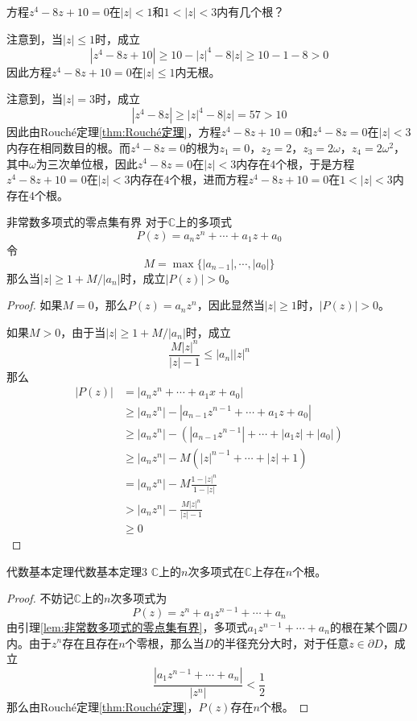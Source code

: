 \documentclass[lang = cn, scheme = chinese, thmcnt = section]{elegantbook}
\newcommand{\C}{\mathbb{C}}  		   %
\begin{document}
\begin{example}
	方程$z^4-8z+10=0$在$|z|<1$和$1<|z|<3$内有几个根？
\end{example}

\begin{solution}
	注意到，当$|z|\le 1$​时，成立
	$$
	|z^4-8z+10|\ge10-|z|^4-8|z|\ge10-1-8>0
	$$
	因此方程$z^4-8z+10=0$在$|z|\le 1$内无根。
	
	注意到，当$|z|=3$时，成立
	$$
	|z^4-8z|\ge|z|^4-8|z|=57>10
	$$
	因此由Rouché定理\ref{thm:Rouché定理}，方程$z^4-8z+10=0$和$z^4-8z=0$在$|z|<3$内存在相同数目的根。而$z^4-8z=0$的根为$z_1=0$，$z_2=2$，$z_3=2\omega$，$z_4=2\omega^2$，其中$\omega$为三次单位根，因此$z^4-8z=0$在$|z|<3$内存在$4$个根，于是方程$z^4-8z+10=0$在$|z|<3$内存在$4$个根，进而方程$z^4-8z+10=0$在$1<|z|<3$内存在$4$个根。
\end{solution}

\begin{lemma}{}{非常数多项式的零点集有界}
	对于$\C$上的多项式%
	$$
	P(z)=a_nz^n+\cdots+a_1z+a_0
	$$
	令%
	$$
	M=\max\{ |a_{n-1}|,\cdots,|a_0| \}
	$$
	那么当$|z|\ge  1+M/|a_n|$时，成立$|P(z)|>0$。
\end{lemma}

\begin{proof}
	如果$M=0$，那么$P(z)=a_nz^n$，因此显然当$|z|\ge 1$时，$|P(z)|>0$。
	
	如果$M>0$，由于当$|z|\ge  1+M/|a_n|$时，成立%
	$$
	\frac{M|z|^n}{|z|-1}\le|a_n||z|^n
	$$
	那么
	\begin{align*}
		|P(z)|
		& = |a_nz^n+\cdots+a_1x+a_0|\\
		& \ge |a_nz^n|-|a_{n-1}z^{n-1}+\cdots+a_1z+a_0|\\
		& \ge |a_nz^n|-(|a_{n-1}z^{n-1}|+\cdots+|a_1z|+|a_0|)\\
		& \ge |a_nz^n|-M(|z|^{n-1}+\cdots+|z|+1)\\
		& = |a_nz^n|-M\frac{1-|z|^n}{1-|z|}\\
		& >|a_nz^n|- \frac{M|z|^n}{|z|-1}\\
		& \ge 0
	\end{align*}
\end{proof}

\begin{corollary}{代数基本定理}{代数基本定理3}
	$\C$上的$n$次多项式在$\C$上存在$n$个根。
\end{corollary}

\begin{proof}
	不妨记$\C$上的$n$次多项式为%
	$$
	P(z)=z^n+a_1z^{n-1}+\cdots+a_n
	$$
	由引理\ref{lem:非常数多项式的零点集有界}，多项式$a_1z^{n-1}+\cdots+a_n$的根在某个圆$D$内。由于$z^n$存在且存在$n$个零根，那么当$D$的半径充分大时，对于任意$z\in\partial D$，成立
	$$
	\frac{|a_1z^{n-1}+\cdots+a_n|}{|z^n|}<\frac{1}{2}
	$$
	那么由Rouché定理\ref{thm:Rouché定理}，$P(z)$存在$n$个根。
\end{proof}
\end{document}

